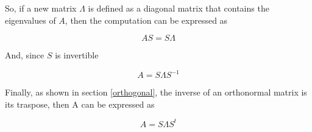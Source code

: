 \documentclass[12pt,journal]{IEEEtran}
\begin{document}
    So, if a new matrix $\Lambda$ is defined as a diagonal matrix that contains
    the eigenvalues of $A$, then the computation can be expressed as

    \begin{equation*}
        A S = S \Lambda
    \end{equation*}

    And, since $S$ is invertible

    \begin{equation*}
        A = S \Lambda S^{-1}
    \end{equation*}

    Finally, as shown in section \ref{orthogonal}, the inverse of an orthonormal
    matrix is its traspose, then A can be expressed as

    \begin{equation*}
        A = S \Lambda S^t
    \end{equation*}



\end{document}
